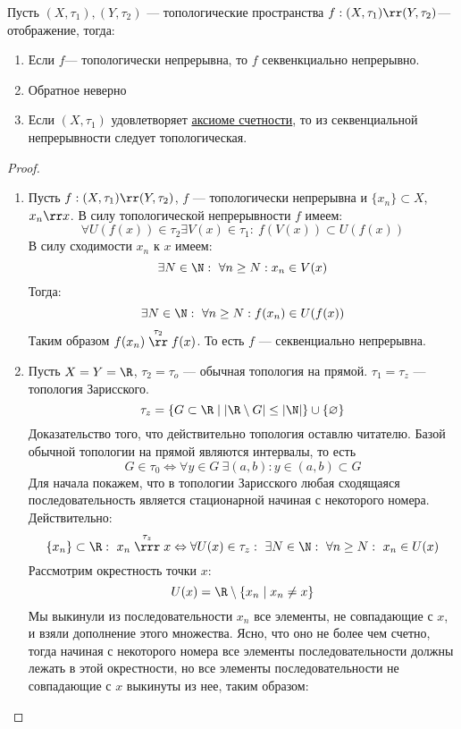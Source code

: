\begin{claim}
	Пусть $(X, \tau_1), (Y, \tau_2)$ --- топологические пространства $f: (X,\tau_1) \rr (Y, \tau_2)$--- отображение, тогда:
	\begin{enumerate}
		\item Если $f$--- топологически непрерывна, то $f$ секвенкциально непрерывно.
		\item Обратное неверно
		\item Если $(X, \tau_1)$ удовлетворяет \hyperlink{fcs}{аксиоме счетности}, то из секвенциальной непрерывности следует топологическая.
	\end{enumerate}
\end{claim}
\begin{proof}
\hfill 
\begin{enumerate}
	\item 
	Пусть $f: (X, \tau_1) \rr (Y, \tau_2)$, $f$ --- топологически непрерывна и $\{x_n\} \subset X$, $x_n \rr x$. В силу топологической непрерывности $f$ имеем:
	$$
	\forall U(f(x)) \in \tau_2 \exists V(x) \in \tau_1: \ f(V(x)) \subset U(f(x))
	$$
	В силу сходимости $x_n$ к $x$ имеем:
	$$
	\exists N \in \N: \ \forall n \geq N: x_n \in V(x)
	$$
	Тогда:
	$$
	\exists N \in \N: \ \forall n \geq N: f(x_n) \in U(f(x))
	$$
	Таким образом $f(x_n) \stackrel{\tau_2}{\rr} f(x)$. То есть $f$ --- секвенциально непрерывна.
	\item Пусть $X = Y = \R$, $\tau_2 = \tau_o$ --- обычная топология на прямой. $\tau_1 = \tau_z$ --- топология Зарисского. 
	$$
	\tau_z = \{G \subset \R \mid |\R \setminus G | \leq |\N| \}\cup \{\varnothing\} 
	$$
	Доказательство того, что действительно топология оставлю читателю.
	Базой обычной топологии на прямой являются интервалы, то есть 
	$$
	G \in \tau_0  \Leftrightarrow \forall y \in G \ \exists (a,b): y \in (a,b) \subset G
	$$ 
	Для начала покажем, что в топологии Зарисского любая сходящаяся последовательность является стационарной начиная с некоторого номера. Действительно: 
	$$
	\{x_n\} \subset \R: \ x_n \stackrel{\tau_z}{\rrr} x \Leftrightarrow \forall U(x) \in \tau_z :\  \exists N \in \N: \ \forall n \geq N: \ x_n \in U(x)
	$$
	Рассмотрим окрестность точки $x$: 
	$$
	U(x) = \R \setminus \{x_n \mid x_n \neq x\}
	$$ 
	Мы выкинули из последовательности $x_n$ все элементы, не совпадающие с $x$, и взяли дополнение этого множества. Ясно, что оно не более чем счетно, тогда начиная с некоторого номера все элементы последовательности должны лежать в этой окрестности, но все элементы последовательности не совпадающие с $x$ выкинуты из нее, таким образом:
	$$
$$
\end{enumerate}
\end{proof}
